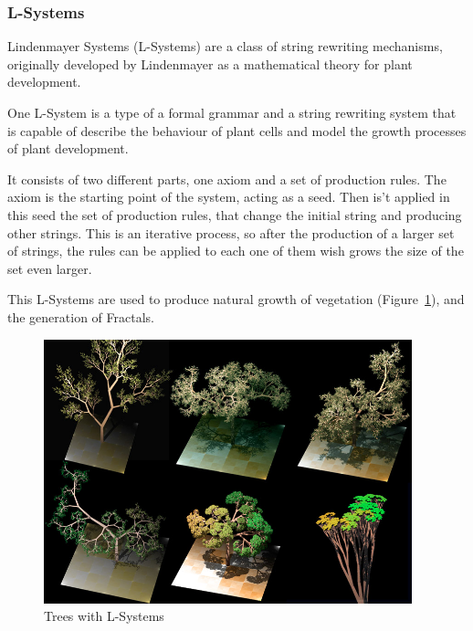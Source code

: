 
\subsubsection{L-Systems} %
\label{ssub:l_systems}

Lindenmayer Systems (L-Systems) are a class of string rewriting mechanisms, originally developed by Lindenmayer as a mathematical theory for plant development.

One L-System is a type of a formal grammar and a string rewriting system that is capable of describe the behaviour of plant cells and model the growth processes of plant development.

It consists of two different parts, one axiom and a set of production rules. The axiom is the starting point of the system, acting as a seed. Then is't applied in this seed the set of production rules, that change the initial string and producing other strings.
This is an iterative process, so after the production of a larger set of strings, the rules can be applied to each one of them wish grows the size of the set even larger.

This L-Systems are used to produce natural growth of vegetation (Figure~\ref{fig:trees}), and the generation of Fractals. 


\begin{figure}[htbp]
    \centering
    \includegraphics[width=0.95\textwidth]{img/Theory/L_Systems/Dragon_trees.jpg}
    \caption{Trees with L-Systems}
    \label{fig:trees}
\end{figure}


